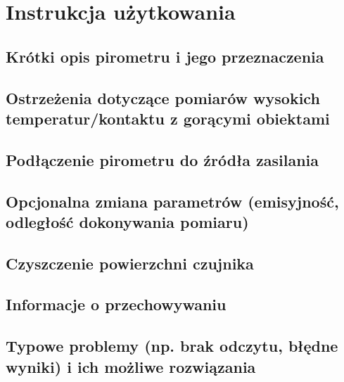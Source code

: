 \chapter{Instrukcja użytkowania}
\section{Krótki opis pirometru i jego przeznaczenia}
\section{Ostrzeżenia dotyczące pomiarów  wysokich temperatur/kontaktu z gorącymi obiektami}
\section{Podłączenie pirometru do źródła zasilania}
\section{Opcjonalna zmiana parametrów (emisyjność, odległość dokonywania pomiaru)}
\section{Czyszczenie powierzchni czujnika}
\section{Informacje o przechowywaniu}
\section{Typowe problemy (np. brak odczytu, błędne wyniki) i ich możliwe rozwiązania}
